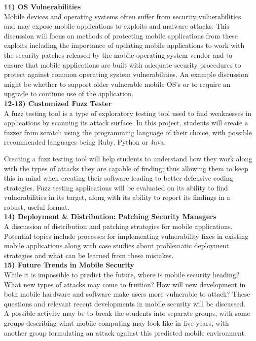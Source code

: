 \documentclass[conference]{IEEEtran}
\begin{document}
\textbf{11) OS Vulnerabilities}\\
Mobile devices and operating systems often suffer from security vulnerabilities and may expose mobile applications to exploits and malware attacks. This discussion will focus on methods of protecting mobile applications from these exploits including the importance of updating mobile applications to work with the security patches released by the mobile operating system vendor and to ensure that mobile applications are built with adequate security procedures to protect against common operating system vulnerabilities.  An example discussion might be whether to support older vulnerable mobile OS's or to require an upgrade to continue use of the application. \\

\textbf{12-13) Customized Fuzz Tester}\\
A fuzz testing tool is a type of exploratory testing tool used to find weaknesses in applications by scanning its attack surface. In this project, students will create a fuzzer from scratch using the programming language of their choice, with possible recommended languages being Ruby, Python or Java.

Creating a fuzz testing tool will help students to understand how they work along with the types of attacks they are capable of finding; thus allowing them to keep this in mind when creating their software leading to better defensive coding strategies. Fuzz testing applications will be evaluated on its ability to find vulnerabilities in its target, along with its ability to report its findings in a robust, useful format. \\

\textbf{14) Deployment \& Distribution: Patching Security Managers}\\
A discussion of distribution and patching strategies for mobile applications. Potential topics include processes for implementing vulnerability fixes in existing mobile applications along with case studies about problematic deployment strategies and what can be learned from these mistakes. \\

\textbf{15) Future Trends in Mobile Security}\\
While it is impossible to predict the future, where is mobile security heading? What new types of attacks may come to fruition? How will new development in both mobile hardware and software make users more vulnerable to attack? These questions and relevant recent developments in mobile security will be discussed. A possible activity may be to break the students into separate groups, with some groups describing what mobile computing may look like in five years, with another group formulating an attack against this predicted mobile environment.  \\
\end{document}
